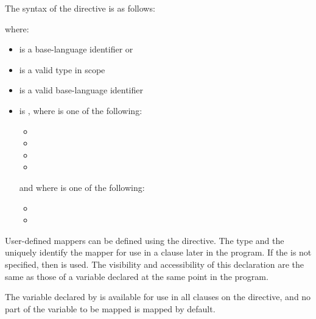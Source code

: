 \begin{fortranspecific}
The syntax of the  directive is as follows:

\end{fortranspecific}

where:

\begin{itemize}
\item {} is a base-language identifier or 
\item {} is a valid type in scope
\item {} is a valid base-language identifier
\item {} is \plc{[[map-type-modifier[}\pcode{,}\plc{] [map-type-modifier[}\pcode{,}\plc{] ...]] map-type}\pcode{:}\plc{ ] list}\pcode{)}
, where  is one of the following:

\begin{itemize}
\item {}
\item {}
\item {}
\item {}
\end{itemize}

and where  is one of the following:

\begin{itemize}
\item {}
\item {}
\end{itemize}
\end{itemize}

\descr
User-defined mappers can be defined using the  directive.
The type and the  uniquely identify the mapper for use in
a  clause later in the program.  If the  is not
specified, then  is used.  The visibility and accessibility of
this declaration are the same as those of a variable declared at the same point
in the program.

The variable declared by  is available for use in all 
clauses on the directive, and no part of the variable to be mapped is mapped by
default.

